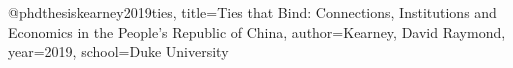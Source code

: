 @phdthesis{kearney2019ties,
  title={Ties that Bind: Connections, Institutions and Economics in the People’s Republic of China},
  author={Kearney, David Raymond},
  year={2019},
  school={Duke University}
}